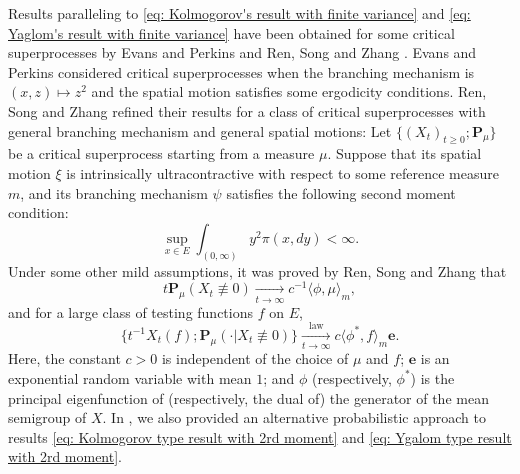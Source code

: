 \documentclass[12pt, a4paper]{amsart}
\theoremstyle{definition}
\numberwithin{equation}{section}
\begin{document}
	Results paralleling to \eqref{eq: Kolmogorov's result with finite variance} and \eqref{eq: Yaglom's result with finite variance} have been obtained for some critical superprocesses by Evans and Perkins \cite{EvansPerkins1990Measure-valued} and Ren, Song and Zhang \cite{RenSongZhang2015Limit}.
	Evans and Perkins \cite{EvansPerkins1990Measure-valued} considered critical superprocesses when  the branching mechanism is $(x,z)\mapsto z^2$ and the spatial motion satisfies some ergodicity conditions.
	Ren, Song and Zhang \cite{RenSongZhang2015Limit} refined their results for a class of critical superprocesses with general branching mechanism and general spatial motions:
	Let $\{(X_t)_{t\geq 0}; \mathbf P_\mu \}$ be a critical superprocess starting from a measure $\mu$.
	Suppose that its spatial motion $\xi$ is intrinsically ultracontractive with respect to some reference measure $m$, and its branching mechanism $\psi$ satisfies the following second moment condition:
\[\label{eq: second moment condition}
	\sup_{x\in E} \int_{(0,\infty)} y^2 \pi(x,dy)
	< \infty.
\]
	Under some other mild assumptions, it was proved by Ren, Song and Zhang \cite{RenSongZhang2015Limit} that
\[\label{eq: Kolmogorov type result with 2rd moment}
	t \mathbf P_\mu(X_t \not \equiv 0)
	\xrightarrow[t\to \infty]{} c^{-1} \langle \phi, \mu \rangle_m,
\]
	and for a large class of testing functions $f$ on $E$,
\[\label{eq: Ygalom type result with 2rd moment}
	\{ t^{-1}X_t(f); \mathbf P_\mu (\cdot | X_t \not\equiv 0)\}
	\xrightarrow[t\to \infty]{\operatorname{law}} c \langle \phi^*, f\rangle_m \mathbf e.
\]
	Here, the constant $c > 0$ is independent of the choice of $\mu$ and $f$;
	$\mathbf e$ is an exponential random variable with mean $1$;
	and $\phi$ (respectively, $\phi^*$) is the principal eigenfunction of (respectively, the dual of) the generator of the mean semigroup of $X$.
	In \cite{RenSongSun2017Spine}, we also provided an alternative probabilistic approach to results \eqref{eq: Kolmogorov type result with 2rd moment} and \eqref{eq: Ygalom type result with 2rd moment}.
	
\end{document}
